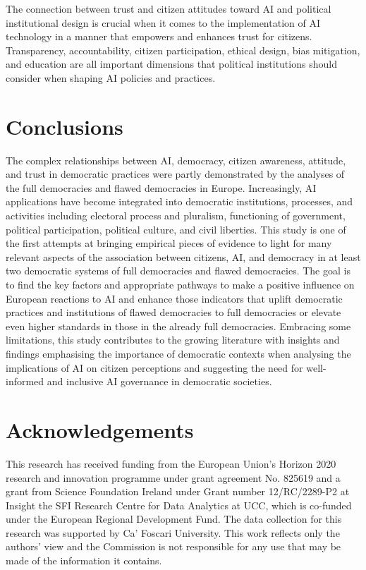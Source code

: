 \documentclass[
]{ceurart}
\begin{document}
The connection between trust and citizen attitudes toward AI and political institutional design is crucial when it comes to the implementation of AI technology in a manner that empowers and enhances trust for citizens. Transparency, accountability, citizen participation, ethical design, bias mitigation, and education are all important dimensions that political institutions should consider when shaping AI policies and practices.


\section{Conclusions}
The complex relationships between AI, democracy, citizen awareness, attitude, and trust in democratic practices were partly demonstrated by the analyses of the full democracies and flawed democracies in Europe. Increasingly, AI applications have become integrated into democratic institutions, processes, and activities including electoral process and pluralism, functioning of government, political participation, political culture, and civil liberties. This study is one of the first attempts at bringing empirical pieces of evidence to light for many relevant aspects of the association between citizens, AI, and democracy in at least two democratic systems of full democracies and flawed democracies. The goal is to find the key factors and appropriate pathways to make a positive influence on European reactions to AI and enhance those indicators that uplift democratic practices and institutions of flawed democracies to full democracies or elevate even higher standards in those in the already full democracies. 
Embracing some limitations, this study contributes to the growing literature with insights and findings emphasising the importance of democratic contexts when analysing the implications of AI on citizen perceptions and suggesting the need for well-informed and inclusive AI governance in democratic societies.

\section{Acknowledgements}
This research has received funding from the European Union’s Horizon 2020 research and innovation programme under grant agreement No. 825619 and a grant from Science Foundation Ireland under Grant number 12/RC/2289-P2 at Insight the SFI Research Centre for Data Analytics at UCC, which is co-funded under the European Regional Development Fund. The data collection for this research was supported by Ca' Foscari University. This work reflects only the authors' view and the Commission is not responsible for any use that may be made of the information it contains.

\appendix
\end{document}
